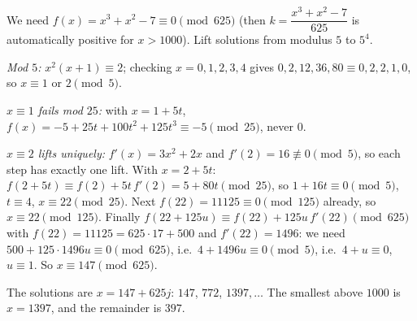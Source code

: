 We need $f(x)=x^3+x^2-7\equiv0\pmod{625}$ (then $k=\dfrac{x^3+x^2-7}{625}$ is automatically positive for $x>1000$). Lift solutions from modulus $5$ to $5^4$.

\emph{Mod $5$:} $x^2(x+1)\equiv2$; checking $x=0,1,2,3,4$ gives $0,2,12,36,80\equiv0,2,2,1,0$, so $x\equiv1$ or $2\pmod5$.

\emph{$x\equiv1$ fails mod $25$:} with $x=1+5t$, $f(x)=-5+25t+100t^2+125t^3\equiv-5\pmod{25}$, never $0$.

\emph{$x\equiv2$ lifts uniquely:} $f'(x)=3x^2+2x$ and $f'(2)=16\not\equiv0\pmod5$, so each step has exactly one lift. With $x=2+5t$: $f(2+5t)\equiv f(2)+5t\,f'(2)=5+80t\pmod{25}$, so $1+16t\equiv0\pmod5$, $t\equiv4$, $x\equiv22\pmod{25}$. Next $f(22)=11125\equiv0\pmod{125}$ already, so $x\equiv22\pmod{125}$. Finally $f(22+125u)\equiv f(22)+125u\,f'(22)\pmod{625}$ with $f(22)=11125=625\cdot17+500$ and $f'(22)=1496$: we need $500+125\cdot1496u\equiv0\pmod{625}$, i.e.\ $4+1496u\equiv0\pmod 5$, i.e.\ $4+u\equiv0$, $u\equiv1$. So $x\equiv147\pmod{625}$.

The solutions are $x=147+625j$: $147$, $772$, $1397,\dots$ The smallest above $1000$ is $x=1397$, and the remainder is $\boxed{397}$.
